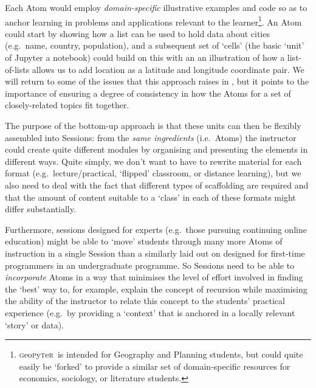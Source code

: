 \documentclass[letter, 11pt,titlepage]{article}
\newcommand{\gp}{\textsc{g}eo\textsc{p}y\textsc{t}e\textsc{r}~\/}
\newcommand{\eg}{e.g.~\/}
\newcommand{\ie}{i.e.~\/}
\begin{document}
Each Atom would employ \emph{domain-specific} illustrative examples and code so as to anchor learning in problems and applications relevant to the learner\footnote{\gp is intended for Geography and Planning students, but could quite easily be `forked' to provide a similar set of domain-specific resources for economics, sociology, or literature students.}. An Atom could start by showing how a list can be used to hold data about cities (\eg name, country, population), and a subsequent set of `cells' (the basic `unit' of Jupyter a notebook) could build on this with an an illustration of how a list-of-lists allows us to add location as a latitude and longitude coordinate pair. We will return to some of the issues that this approach raises in , but it points to the importance of ensuring a degree of consistency in how the Atoms for a set of closely-related topics fit together. 

The purpose of the bottom-up approach is that these units can then be flexibly assembled into Sessions: from the \emph{same ingredients} (\ie Atoms) the instructor could create quite different modules by organising and presenting the elements in different ways. Quite simply, we don't want to have to rewrite material for each format (\eg lecture/practical, `flipped' classroom, or distance learning), but we also need to deal with the fact that different types of scaffolding are required and that the amount of content suitable to a `class' in each of these formats might differ substantially. 

Furthermore, sessions designed for experts (\eg those pursuing continuing online education) might be able to `move' students through many more Atoms of instruction in a single Session than a similarly laid out on designed for first-time programmers in an undergraduate programme. So Sessions need to be able to \emph{incorporate} Atoms in a way that minimises the level of effort involved in finding the `best' way to, for example, explain the concept of recursion while maximising the ability of the instructor to relate this concept to the students' practical experience (\eg by providing a `context' that is anchored in a locally relevant `story' or data).
\end{document}
